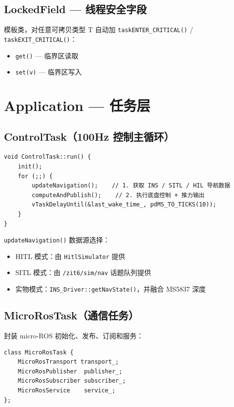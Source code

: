 \documentclass[12pt,a4paper]{article}
\begin{document}
\subsection{LockedField — 线程安全字段}

模板类，对任意可拷贝类型 T 自动加 \texttt{taskENTER\_CRITICAL()} / \texttt{taskEXIT\_CRITICAL()}：
\begin{itemize}
    \item \texttt{get()} — 临界区读取
    \item \texttt{set(v)} — 临界区写入
\end{itemize}

\section{Application — 任务层}

\subsection{ControlTask（100Hz 控制主循环）}

\begin{lstlisting}[caption={ControlTask 主循环}]
void ControlTask::run() {
    init();
    for (;;) {
        updateNavigation();    // 1. 获取 INS / SITL / HIL 导航数据
        computeAndPublish();    // 2. 执行底盘控制 + 推力输出
        vTaskDelayUntil(&last_wake_time_, pdMS_TO_TICKS(10));
    }
}
\end{lstlisting}

\texttt{updateNavigation()} 数据源选择：
\begin{itemize}
    \item HITL 模式：由 \texttt{HitlSimulator} 提供
    \item SITL 模式：由 \texttt{/zit6/sim/nav} 话题队列提供
    \item 实物模式：\texttt{INS\_Driver::getNavState()}，并融合 MS5837 深度
\end{itemize}

\subsection{MicroRosTask（通信任务）}

封装 micro-ROS 初始化、发布、订阅和服务：

\begin{lstlisting}[caption={MicroRosTask 结构}]
class MicroRosTask {
    MicroRosTransport transport_;
    MicroRosPublisher  publisher_;
    MicroRosSubscriber subscriber_;
    MicroRosService    service_;
};
\end{lstlisting}
\end{document}
